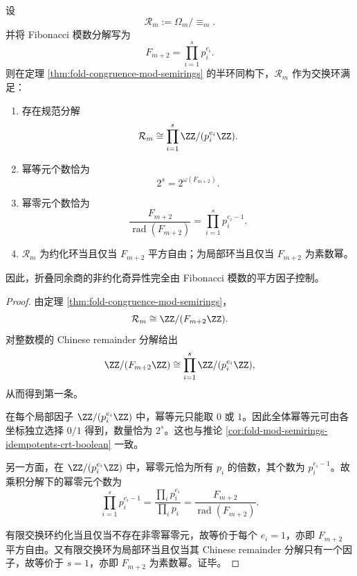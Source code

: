 \begin{theorem}[折叠同余商半环的奇异环判别与幂零层大小]\label{thm:xi-fold-congruence-semiring-singularity-nilpotent-profile}
设
\[
\mathcal R_m:=\Omega_m/\!\equiv_m.
\]
并将 Fibonacci 模数分解写为
\[
F_{m+2}=\prod_{i=1}^{s}p_i^{e_i}.
\]
则在定理 \ref{thm:fold-congruence-mod-semirings} 的半环同构下，\(\mathcal R_m\) 作为交换环满足：
\begin{enumerate}
  \item 存在规范分解
  \[
  \mathcal R_m\cong \prod_{i=1}^{s}\ZZ/(p_i^{e_i}\ZZ).
  \]
  \item 幂等元个数恰为
  \[
  2^{s}=2^{\omega(F_{m+2})}.
  \]
  \item 幂零元个数恰为
  \[
  \frac{F_{m+2}}{\operatorname{rad}(F_{m+2})}
  =
  \prod_{i=1}^{s}p_i^{e_i-1}.
  \]
  \item \(\mathcal R_m\) 为约化环当且仅当 \(F_{m+2}\) 平方自由；为局部环当且仅当 \(F_{m+2}\) 为素数幂。
\end{enumerate}
因此，折叠同余商的非约化奇异性完全由 Fibonacci 模数的平方因子控制。
\end{theorem}
\begin{proof}
由定理 \ref{thm:fold-congruence-mod-semirings}，
\[
\mathcal R_m\cong \ZZ/(F_{m+2}\ZZ).
\]
对整数模的 Chinese remainder 分解给出
\[
\ZZ/(F_{m+2}\ZZ)\cong \prod_{i=1}^{s}\ZZ/(p_i^{e_i}\ZZ),
\]
从而得到第一条。

在每个局部因子 \(\ZZ/(p_i^{e_i}\ZZ)\) 中，幂等元只能取 \(0\) 或 \(1\)。因此全体幂等元可由各坐标独立选择 \(0/1\) 得到，数量恰为 \(2^s\)。这也与推论 \ref{cor:fold-mod-semirings-idempotents-crt-boolean} 一致。

另一方面，在 \(\ZZ/(p_i^{e_i}\ZZ)\) 中，幂零元恰为所有 \(p_i\) 的倍数，其个数为 \(p_i^{e_i-1}\)。故乘积分解下的幂零元个数为
\[
\prod_{i=1}^{s}p_i^{e_i-1}
=
\frac{\prod_i p_i^{e_i}}{\prod_i p_i}
=
\frac{F_{m+2}}{\operatorname{rad}(F_{m+2})}.
\]

有限交换环约化当且仅当不存在非零幂零元，故等价于每个 \(e_i=1\)，亦即 \(F_{m+2}\) 平方自由。又有限交换环为局部环当且仅当其 Chinese remainder 分解只有一个因子，故等价于 \(s=1\)，亦即 \(F_{m+2}\) 为素数幂。证毕。
\end{proof}

